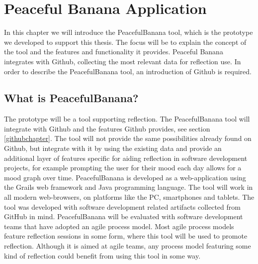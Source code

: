 \chapter{Peaceful Banana Application}
\label{peacefulBananaApplication}
In this chapter we will introduce the PeacefulBanana tool, which is the prototype we developed to support this thesis. The focus will be to explain the concept of the tool and the features and functionality it provides. 
Peaceful Banana integrates with Github, collecting the most relevant data for reflection use. In order to describe the PeacefulBanana tool, an introduction of Github is required.\\

\section{What is PeacefulBanana?}
The prototype will be a tool supporting reflection. The PeacefulBanana tool will integrate with Github and the features Github provides, see section \ref{githubchapter}. The tool will not provide the same possibilities already found on Github, but integrate with it by using the existing data and provide an additional layer of features specific for aiding reflection in software development projects, for example prompting the user for their mood each day allows for a mood graph over time. PeacefulBanana is developed as a web-application using the Grails web framework and Java programming language. The tool will work in all modern web-browsers, on platforms like the PC, smartphones and tablets. 
The tool was developed with software development related artifacts collected from GitHub in mind. PeacefulBanana will be evaluated with software development teams that have adopted an agile process model. Most agile process models feature reflection sessions in some form, where this tool will be used to promote reflection. Although it is aimed at agile teams, any process model featuring some kind of reflection could benefit from using this tool in some way.  

